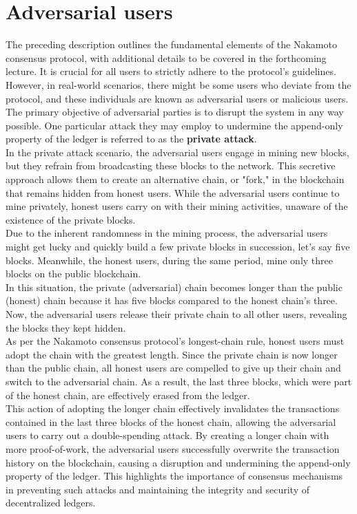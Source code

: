 \section{Adversarial users}

The preceding description outlines the fundamental elements of the Nakamoto consensus protocol, with additional details to be covered in the forthcoming lecture. It is crucial for all users to strictly adhere to the protocol's guidelines. However, in real-world scenarios, there might be some users who deviate from the protocol, and these individuals are known as adversarial users or malicious users.\\
The primary objective of adversarial parties is to disrupt the system in any way possible. One particular attack they may employ to undermine the append-only property of the ledger is referred to as the \textbf{private attack}.\\
In the private attack scenario, the adversarial users engage in mining new blocks, but they refrain from broadcasting these blocks to the network. This secretive approach allows them to create an alternative chain, or "fork," in the blockchain that remains hidden from honest users. While the adversarial users continue to mine privately, honest users carry on with their mining activities, unaware of the existence of the private blocks.\\
Due to the inherent randomness in the mining process, the adversarial users might get lucky and quickly build a few private blocks in succession, let's say five blocks. Meanwhile, the honest users, during the same period, mine only three blocks on the public blockchain.\\

In this situation, the private (adversarial) chain becomes longer than the public (honest) chain because it has five blocks compared to the honest chain's three. Now, the adversarial users release their private chain to all other users, revealing the blocks they kept hidden.\\
As per the Nakamoto consensus protocol's longest-chain rule, honest users must adopt the chain with the greatest length. Since the private chain is now longer than the public chain, all honest users are compelled to give up their chain and switch to the adversarial chain. As a result, the last three blocks, which were part of the honest chain, are effectively erased from the ledger.\\
This action of adopting the longer chain effectively invalidates the transactions contained in the last three blocks of the honest chain, allowing the adversarial users to carry out a double-spending attack. By creating a longer chain with more proof-of-work, the adversarial users successfully overwrite the transaction history on the blockchain, causing a disruption and undermining the append-only property of the ledger. This highlights the importance of consensus mechanisms in preventing such attacks and maintaining the integrity and security of decentralized ledgers.


